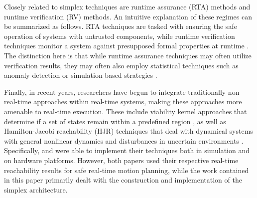 \documentclass[manuscript,screen,review]{acmart}
\begin{document}

Closely related to simplex techniques are runtime assurance (RTA) methods and runtime verification (RV) methods. An intuitive explanation of these regimes can be summarized as follows. RTA techniques are tasked with ensuring the safe operation of systems with untrusted components, while runtime verification techniques monitor a system against presupposed formal properties at runtime 
\cite{Masson2018,Akametalu2014,mitsch,Daws1998,Phan2020}. The distinction here is that while runtime assurance techniques may often utilize verification results, they may often also employ statistical techniques such as anomaly detection \cite{boursinos2020trusted} or simulation based strategies \cite{TranSimulation2019}. %

Finally, in recent years, researchers have begun to integrate traditionally non real-time approaches within real-time systems, making these approaches more amenable to real-time execution. These include viability kernel approaches that determine if a set of states remain within a predefined region \cite{Gurriet2018,Althoff2014}, as well as Hamilton-Jacobi reachability (HJR) techniques that deal with dynamical systems with general nonlinear dynamics and disturbances in uncertain environments \cite{Herbert2019,Bajcsy2019Provably,bansal2020hamiltonjacobi,Fisac2017,Chen2016,dhinakaran2017hybrid}. Specifically, \cite{Bajcsy2019Provably} and \cite{Althoff2014} were able to implement their techniques both in simulation and on hardware platforms. However, both papers used their respective real-time reachability results for safe real-time motion planning, while the work contained in this paper primarily dealt with the construction and implementation of the simplex architecture. 
\end{document}

